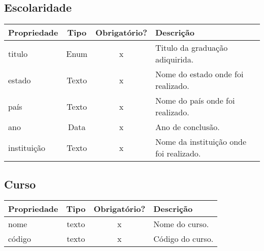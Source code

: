 \subsection{Escolaridade} \label{Escolaridade}
\begin{table}[h!]
	\footnotesize
	\begin{tabular}{|p{2.6cm}|c|c|p{7.8cm}|}   \hline \rowcolor[rgb]{0.8,0.8,0.8}
	
		
 		\textbf{Propriedade} & \textbf{Tipo} & \textbf{Obrigatório?} & \centerline{\textbf{Descrição}} \\\hline  	
	
 		titulo & Enum & x & Titulo da graduação adiquirida. \\\hline
		
		estado & Texto & x & Nome do estado onde foi realizado. \\\hline   
 		                      
		país & Texto & x & Nome do país onde foi realizado. \\\hline
		
		ano & Data & x & Ano de conclusão. \\\hline
		
		instituição & Texto & x & Nome da instituição onde foi realizado. \\\hline	
		
			
		
	\end{tabular}	
\end{table}

\newpage

\subsection{Curso} \label{Curso}
\begin{table}[h!]
	\footnotesize
	\begin{tabular}{|p{2.6cm}|c|c|p{7.8cm}|}   \hline \rowcolor[rgb]{0.8,0.8,0.8}
	
		
 		\textbf{Propriedade} & \textbf{Tipo} & \textbf{Obrigatório?} & \centerline{\textbf{Descrição}} \\\hline 
 		                            
		nome & texto & x & Nome do curso. \\\hline 
		
		código & texto & x & Código do curso. \\\hline 
		                             
		
	\end{tabular}	
\end{table}




